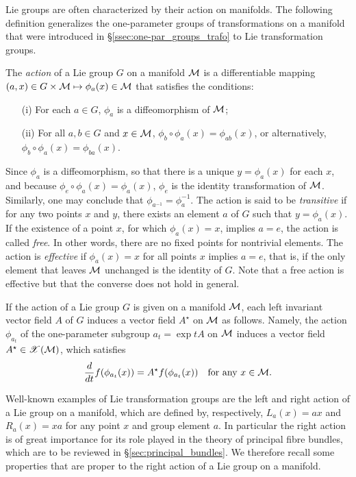 \documentclass[
final,
11pt,
a4paper,
DIV=11,
headinclude=true,
footinclude=false,
bibliography=totoc,
twoside=true,  %
BCOR=5mm
]{scrbook}
\begin{document}
Lie groups are often characterized by their action on manifolds.  
The following definition generalizes the one-parameter groups of 
transformations on a manifold that were introduced in 
\S\ref{ssec:one-par_groups_trafo} to Lie transformation groups.
\begin{definition}
  The \emph{action} of a Lie group $G$ on a manifold $\mathcal{M}$ is 
  a differentiable mapping $(a,x) \in G \times \mathcal{M} \mapsto 
  \phi_a(x) \in \mathcal{M}$ that satisfies the conditions:
  \begin{itemize}
    \item[(i)] For each $a \in G$, $\phi_a$ is a diffeomorphism 
      of $\mathcal{M}$;
    \item[(ii)] For all $a,b \in G$ and $x \in \mathcal{M}$, $\phi_b 
      \circ \phi_a(x) = \phi_{ab}(x)$, or alternatively, $\phi_b 
      \circ \phi_a(x) = \phi_{ba}(x)$.
  \end{itemize}
\end{definition}
Since $\phi_a$ is a diffeomorphism, so that there is a unique $y 
= \phi_a(x)$ for each $x$, and because $\phi_e \circ \phi_a(x) = 
\phi_a(x)$, $\phi_e$ is the identity transformation of $\mathcal{M}$.  
Similarly, one may conclude that $\phi_{a^{-1}} = \phi_a^{-1}$.
The action is said to be \emph{transitive} if for any two points 
$x$ and $y$, there exists an element $a$ of $G$ such that $y = 
\phi_a (x)$. If the existence of a point $x$, for which 
$\phi_a(x) = x$, implies $a = e$, the action is called 
\emph{free}. In other words, there are no fixed points for 
nontrivial elements. The action is \emph{effective} if $\phi_a(x) 
= x$ for all points $x$ implies $a=e$, that is, if the only 
element that leaves $\mathcal{M}$ unchanged is the identity of $G$.  
Note that a free action is effective but that the converse does 
not hold in general.

If the action of a Lie group $G$ is given on a manifold $\mathcal{M}$, 
each left invariant vector field $A$ of $G$ induces a vector 
field $A^\star$ on $\mathcal{M}$ as follows. Namely, the action 
$\phi_{a_t}$ of the one-parameter subgroup $a_t = \exp tA$ on 
$\mathcal{M}$ induces a vector field $A^\star \in 
\mathscr{X}(\mathcal{M})$, which satisfies
\begin{equation*}
  \frac{d}{dt}f(\phi_{a_t}(x)) = A^\star f(\phi_{a_t}(x))
  \quad\text{for any}~x\in\mathcal{M}.
\end{equation*}

Well-known examples of Lie transformation groups are the left and 
right action of a Lie group on a manifold, which are defined by, 
respectively, $L_a(x) = ax$ and $R_a(x) = xa$ for any point $x$ 
and group element $a$. In particular the right action is of great 
importance for its role played in the theory of principal fibre 
bundles, which are to be reviewed in 
\S\ref{sec:principal_bundles}. We therefore recall some 
properties that are proper to the right action of a Lie group on 
a manifold.
\end{document}
